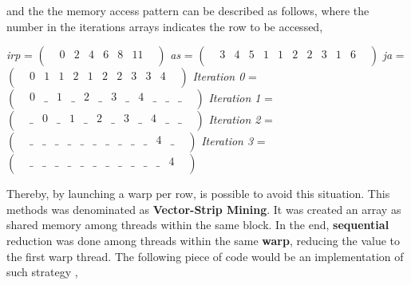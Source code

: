 \documentclass[12pt]{article}
\begin{document}
and the the memory access pattern can be described as follows, where the number in the iterations arrays indicates the row to be accessed, 

\begin{center}
\textit{irp}  =   
$
\begin{pmatrix}
    & 0 & 2 & 4 & 6 & 8 & 11 & \\
\end{pmatrix}
$
\linebreak
\textit{as}  =   
$
\begin{pmatrix}
    & 3 & 4 & 5 & 1 & 1 & 2 & 2 & 3 & 1 & 6 & \\
\end{pmatrix}
$
\linebreak
\textit{ja}  =   
$
\begin{pmatrix}
    & 0 & 1 & 1 & 2 & 1 & 2 & 2 & 3 & 3 & 4 & \\
\end{pmatrix}
$
\linebreak
\linebreak
\textit{Iteration 0}  =   
$
\begin{pmatrix}
    & 0 & \_ & 1 & \_ & 2 & \_ & 3 & \_ & 4 & \_ & \_ & \_ &  \\
\end{pmatrix}
$
\linebreak
\textit{Iteration 1}  =   
$
\begin{pmatrix}
    & \_ & 0 & \_ & 1 & \_ & 2 & \_ & 3 & \_ & 4 & \_ & \_ &  \\
\end{pmatrix}
$
\linebreak
\textit{Iteration 2}  =   
$
\begin{pmatrix}
    & \_ & \_ & \_ & \_ & \_ & \_ & \_ & \_ & \_ & \_ & 4 & \_ & \\
\end{pmatrix}
$
\linebreak
\textit{Iteration 3}  =   
$
\begin{pmatrix}
    & \_ & \_ & \_ & \_ & \_ & \_ & \_ & \_ & \_ & \_ & \_ & 4 & \\
\end{pmatrix}
$
\linebreak
\end{center}

 
\par Thereby, by launching a warp per row, is possible to avoid this situation. This methods was denominated as \textbf{Vector-Strip Mining}. It was created an array as shared memory among threads within the same block. In the end, \textbf{sequential} reduction was done among threads within the same \textbf{warp}, reducing the value to the first warp thread. The following piece of code would be an implementation of such strategy \cite{scalar-vm},
\end{document}
